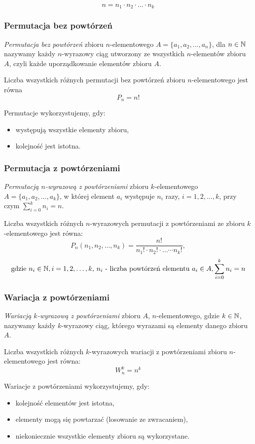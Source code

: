 \documentclass[../Matematyka.tex]{subfiles}
\begin{document}
\[n = n_1 \cdot n_2 \cdot \ldots \cdot n_k\]

\subsubsection{Permutacja bez powtórzeń}
\textit{Permutacja bez powtórzeń} zbioru \(n\)-elementowego \(A = \{a_1, a_2, \ldots, a_n\}\), dla
\(n \in \mathbb{N}\) nazywamy każdy \(n\)-wyrazowy ciąg utworzony ze wszystkich \(n\)-elementów zbioru
\(A\), czyli każde uporządkowanie elementów zbioru \(A\).

Liczba wszystkich różnych permutacji bez powtórzeń zbioru \(n\)-elementowego jest równa
\[P_n = n!\]

Permutacje wykorzystujemy, gdy:
\begin{itemize}
    \item występują wszystkie elementy zbioru,
    \item kolejność jest istotna.
\end{itemize}

\subsubsection{Permutacja z powtórzeniami}
\textit{Permutacją \(n\)-wyrazową z powtórzeniami} zbioru \(k\)-elementowego
\(A = \{a_1, a_2, \ldots, a_k\}\), w której element \(a_i\) występuje \(n_i\) razy, \(i = 1, 2, \ldots, k\), przy czym \(\sum_{i=0}^{k}n_i = n\).

Liczba wszystkich różnych \(n\)-wyrazowych permutacji z powtórzeniami ze zbioru \(k\)-elementowego jest równa:
\[P_n(n_1, n_2, \ldots, n_k) = \frac{n!}{n_1! \cdot n_2! \cdot \ldots \cdots n_k!},\]
\[\text{gdzie } n_i \in \mathbb{N}, i=1,2,\ldots,k \text{, } n_i \text{ - liczba powtórzeń elementu } a_i \in A, \sum_{i=0}^{k}n_i = n\]

\subsubsection{Wariacja z powtórzeniami}
\textit{Wariacją \(k\)-wyrazową z powtórzeniami} zbioru \(A\), \(n\)-elementowego, gdzie \(k\in\mathbb{N}\),
nazywamy każdy \(k\)-wyrazowy ciąg, którego wyrazami są elementy danego zbioru \(A\).

Liczba wszystkich różnych \(k\)-wyrazowych wariacji z powtórzeniami zbioru \(n\)-elementowego jest równa:
\[W_n^k=n^k\]

Wariacje z powtórzeniami wykorzystujemy, gdy:
\begin{itemize}
    \item kolejność elementów jest istotna,
    \item elementy mogą się powtarzać (losowanie ze zwracaniem),
    \item niekoniecznie wszystkie elementy zbioru są wykorzystane.
\end{itemize}
\end{document}
